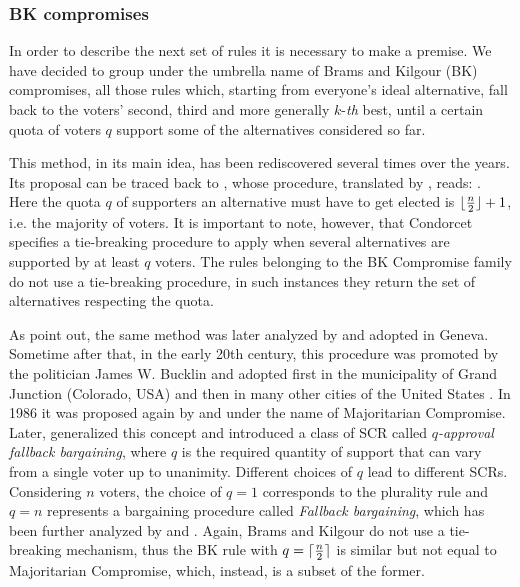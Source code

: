 \subsubsection{BK compromises}
\label{sec:BK}
In order to describe the next set of rules it is necessary to make a premise. We have decided to group under the umbrella name of Brams and Kilgour (BK) compromises, all those rules which, starting from everyone’s ideal alternative, fall back to the voters’ second, third and more generally $k$-\emph{th} best, until a certain quota of voters $q$ support some of the alternatives considered so far.

This method, in its main idea, has been rediscovered several times over the years. Its proposal can be traced back to \citet{Condorcet1789, Condorcet1793}, whose procedure, translated by \citet[pp. 249-250]{McLean1994}, reads: . Here the quota $q$ of supporters an alternative must have to get elected is $\lfloor\frac{n}{2}\rfloor+1$, i.e. the majority of voters. It is important to note, however, that Condorcet specifies a tie-breaking procedure to apply when several alternatives are supported by at least $q$ voters. The rules belonging to the BK Compromise family do not use a tie-breaking procedure, in such instances they return the set of alternatives respecting the quota.

As \cite{Camps2014} point out, the same method was later analyzed by \cite{Lhuilier1793} and adopted in Geneva. Sometime after that, in the early 20th century, this procedure was promoted by the politician James W. Bucklin and adopted first in the municipality of Grand Junction (Colorado, USA) and then in many other cities of the United States \cite[p. 167]{Barber2000}. In 1986 it was proposed again by \citet{Sertel1986} and \citet{Sertel1999} under the name of Majoritarian Compromise. Later, \citet{Brams2001} generalized this concept and introduced a class of \acs{SCR} called $q$\emph{-approval fallback bargaining}, where $q$ is the required quantity of support that can vary from a single voter up to unanimity. Different choices of $q$ lead to different \acp{SCR}. Considering $n$ voters, the choice of $q=1$ corresponds to the plurality rule and $q=n$ represents a bargaining procedure called \emph{Fallback bargaining}, which has been further analyzed by \citet{Kibris2007} and \citet{Congar2012}. Again, Brams and Kilgour do not use a tie-breaking mechanism, thus the BK rule with $q=\lceil\frac{n}{2}\rceil$ is similar but not equal to Majoritarian Compromise, which, instead, is a subset of the former.

